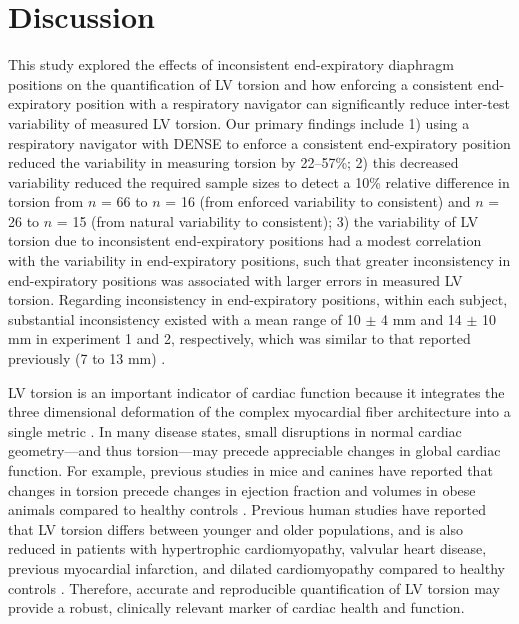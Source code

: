 \section{Discussion}
	This study explored the effects of inconsistent end-expiratory diaphragm positions on the quantification of LV torsion and how enforcing a consistent end-expiratory position with a respiratory navigator can significantly reduce inter-test variability of measured LV torsion. Our primary findings include 1) using a respiratory navigator with DENSE to enforce a consistent end-expiratory position reduced the variability in measuring torsion by 22–57\%; 2) this decreased variability reduced the required sample sizes to detect a 10\% relative difference in torsion from $n$ = 66 to $n$ = 16 (from enforced variability to consistent) and $n$ = 26 to $n$ = 15 (from natural variability to consistent); 3) the variability of LV torsion due to inconsistent end-expiratory positions had a modest correlation with the variability in end-expiratory positions, such that greater inconsistency in end-expiratory positions was associated with larger errors in measured LV torsion. Regarding inconsistency in end-expiratory positions, within each subject, substantial inconsistency existed with a mean range of 10 $\pm$ 4 mm and 14 $\pm$ 10 mm in experiment 1 and 2, respectively, which was similar to that reported previously (7 to 13 mm) \cite{Liu1993,Wang1995a,Taylor1997a,Holland1998c,Fischer2006a}.
	
	LV torsion is an important indicator of cardiac function because it integrates the three dimensional deformation of the complex myocardial fiber architecture into a single metric \cite{Russel2011b,Gotte2006a}. In many disease states, small disruptions in normal cardiac geometry—and thus torsion—may precede appreciable changes in global cardiac function. For example, previous studies in mice and canines have reported that changes in torsion precede changes in ejection fraction and volumes in obese animals compared to healthy controls \cite{Broussard2016a,Kramer2013c}. Previous human studies have reported that LV torsion differs between younger and older populations, and is also reduced in patients with hypertrophic cardiomyopathy, valvular heart disease, previous myocardial infarction, and dilated cardiomyopathy compared to healthy controls \cite{Gotte2006a,Phan2009a,Oxenham2003a,Young1994a,Setser2003a,Garot2002a}. Therefore, accurate and reproducible quantification of LV torsion may provide a robust, clinically relevant marker of cardiac health and function.
	
